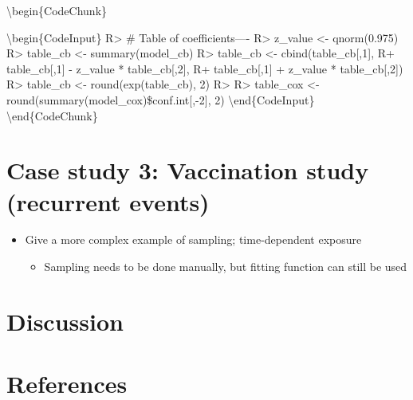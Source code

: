 \documentclass[article]{jss}
\providecommand{\tightlist}{%
  \setlength{\itemsep}{0pt}\setlength{\parskip}{0pt}}
\begin{document}
\textbackslash{}begin\{CodeChunk\}

\textbackslash{}begin\{CodeInput\} R\textgreater{} \# Table of
coefficients---- R\textgreater{} z\_value \textless{}- qnorm(0.975)
R\textgreater{} table\_cb \textless{}- summary(model\_cb)\citet[seq(13,
25, by = 2), 1:2]{coef3} R\textgreater{} table\_cb \textless{}-
cbind(table\_cb{[},1{]}, R+ table\_cb{[},1{]} - z\_value *
table\_cb{[},2{]}, R+ table\_cb{[},1{]} + z\_value * table\_cb{[},2{]})
R\textgreater{} table\_cb \textless{}- round(exp(table\_cb), 2)
R\textgreater{} R\textgreater{} table\_cox \textless{}-
round(summary(model\_cox)\$conf.int{[},-2{]}, 2)
\textbackslash{}end\{CodeInput\} \textbackslash{}end\{CodeChunk\}

\section{Case study 3: Vaccination study (recurrent
events)}\label{case-study-3-vaccination-study-recurrent-events}

\begin{itemize}
\tightlist
\item
  Give a more complex example of sampling; time-dependent exposure

  \begin{itemize}
  \tightlist
  \item
    Sampling needs to be done manually, but fitting function can still
    be used
  \end{itemize}
\end{itemize}

\section{Discussion}\label{discussion}

\section*{References}\label{references}


\end{document}

